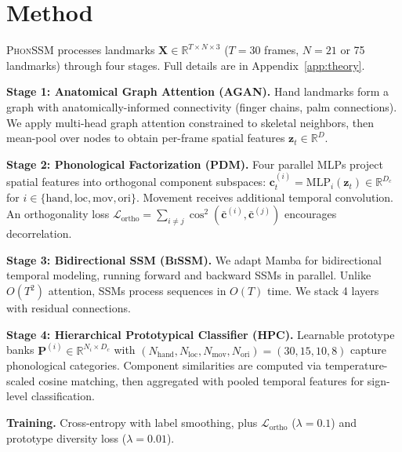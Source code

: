 \documentclass{article}
\newcommand{\phonssm}{\textsc{PhonSSM}}
\newcommand{\agan}{\textsc{AGAN}}
\newcommand{\pdm}{\textsc{PDM}}
\newcommand{\bissm}{\textsc{BiSSM}}
\newcommand{\hpc}{\textsc{HPC}}
\begin{document}
\section{Method}
\label{sec:method}

\phonssm{} processes landmarks $\mathbf{X} \in \mathbb{R}^{T \times N \times 3}$ ($T{=}30$ frames, $N{=}21$ or 75 landmarks) through four stages. Full details are in Appendix~\ref{app:theory}.

\textbf{Stage 1: Anatomical Graph Attention (\agan{}).} Hand landmarks form a graph with anatomically-informed connectivity (finger chains, palm connections). We apply multi-head graph attention \citep{velivckovic2018graph} constrained to skeletal neighbors, then mean-pool over nodes to obtain per-frame spatial features $\mathbf{z}_t \in \mathbb{R}^{D}$.

\textbf{Stage 2: Phonological Factorization (\pdm{}).} Four parallel MLPs project spatial features into orthogonal component subspaces: $\mathbf{c}_t^{(i)} = \text{MLP}_i(\mathbf{z}_t) \in \mathbb{R}^{D_c}$ for $i \in \{\text{hand}, \text{loc}, \text{mov}, \text{ori}\}$. Movement receives additional temporal convolution. An orthogonality loss $\mathcal{L}_{\text{ortho}} = \sum_{i \neq j} \cos^2(\bar{\mathbf{c}}^{(i)}, \bar{\mathbf{c}}^{(j)})$ encourages decorrelation.

\textbf{Stage 3: Bidirectional SSM (\bissm{}).} We adapt Mamba \citep{gu2023mamba} for bidirectional temporal modeling, running forward and backward SSMs in parallel. Unlike $O(T^2)$ attention, SSMs process sequences in $O(T)$ time. We stack 4 layers with residual connections.

\textbf{Stage 4: Hierarchical Prototypical Classifier (\hpc{}).} Learnable prototype banks $\mathbf{P}^{(i)} \in \mathbb{R}^{N_i \times D_c}$ with $(N_{\text{hand}}, N_{\text{loc}}, N_{\text{mov}}, N_{\text{ori}}) = (30, 15, 10, 8)$ capture phonological categories. Component similarities are computed via temperature-scaled cosine matching, then aggregated with pooled temporal features for sign-level classification.

\textbf{Training.} Cross-entropy with label smoothing, plus $\mathcal{L}_{\text{ortho}}$ ($\lambda{=}0.1$) and prototype diversity loss ($\lambda{=}0.01$).


\end{document}
